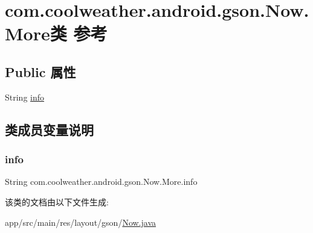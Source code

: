 \hypertarget{classcom_1_1coolweather_1_1android_1_1gson_1_1_now_1_1_more}{}\section{com.\+coolweather.\+android.\+gson.\+Now.\+More类 参考}
\label{classcom_1_1coolweather_1_1android_1_1gson_1_1_now_1_1_more}
\subsection*{Public 属性}
\begin{DoxyCompactItemize}
\item 
String \mbox{\hyperlink{classcom_1_1coolweather_1_1android_1_1gson_1_1_now_1_1_more_af49d0c775e22dd7e77620b1a00ceda96}{info}}
\end{DoxyCompactItemize}


\subsection{类成员变量说明}
\mbox{\label{classcom_1_1coolweather_1_1android_1_1gson_1_1_now_1_1_more_af49d0c775e22dd7e77620b1a00ceda96}} 
\subsubsection{\texorpdfstring{info}{info}}
{\footnotesize\ttfamily String com.\+coolweather.\+android.\+gson.\+Now.\+More.\+info}



该类的文档由以下文件生成\+:\begin{DoxyCompactItemize}
\item 
app/src/main/res/layout/gson/\mbox{\hyperlink{res_2layout_2gson_2_now_8java}{Now.\+java}}\end{DoxyCompactItemize}
